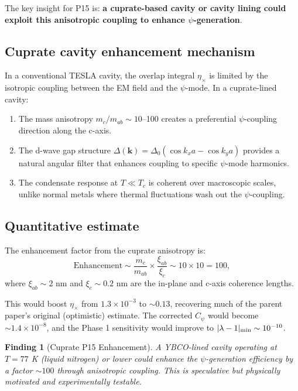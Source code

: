 \documentclass[11pt]{article}
\newtheorem{finding}{Finding}
\newcommand{\ee}[1]{\times 10^{#1}}
\begin{document}
The key insight for P15 is: \textbf{a cuprate-based cavity or cavity lining could exploit this anisotropic coupling to enhance $\psi$-generation}.

\subsection{Cuprate cavity enhancement mechanism}

In a conventional TESLA cavity, the overlap integral $\eta_\times$ is limited by the isotropic coupling between the EM field and the $\psi$-mode. In a cuprate-lined cavity:

\begin{enumerate}
\item The mass anisotropy $m_c/m_{ab} \sim 10$--100 creates a preferential $\psi$-coupling direction along the c-axis.
\item The d-wave gap structure $\Delta(\mathbf{k}) = \Delta_0(\cos k_x a - \cos k_y a)$ provides a natural angular filter that enhances coupling to specific $\psi$-mode harmonics.
\item The condensate response at $T \ll T_c$ is coherent over macroscopic scales, unlike normal metals where thermal fluctuations wash out the $\psi$-coupling.
\end{enumerate}

\subsection{Quantitative estimate}

The enhancement factor from the cuprate anisotropy is:
\[
\text{Enhancement} \sim \frac{m_c}{m_{ab}} \times \frac{\xi_{ab}}{\xi_c} \sim 10 \times 10 = 100,
\]
where $\xi_{ab} \sim 2$ nm and $\xi_c \sim 0.2$ nm are the in-plane and c-axis coherence lengths.

This would boost $\eta_\times$ from $1.3\ee{-3}$ to $\sim 0.13$, recovering much of the parent paper's original (optimistic) estimate. The corrected $C_\psi$ would become $\sim 1.4\ee{-8}$, and the Phase 1 sensitivity would improve to $|\lambda-1|_{\rm min} \sim 10^{-10}$.

\begin{finding}[Cuprate P15 Enhancement]
A YBCO-lined cavity operating at $T = 77$ K (liquid nitrogen) or lower could enhance the $\psi$-generation efficiency by a factor $\sim 100$ through anisotropic coupling. This is speculative but physically motivated and experimentally testable.
\end{finding}
\end{document}
